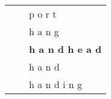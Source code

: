 \documentclass[11pt]{article}
\begin{document}
\begin{spacing}{1}
\begin{table}[!htpb]
\begin{tabular}{p{8cm} l p{5cm}}
                                                                                 &                 & p o r t                                                                                                                                                                                                                                                                                                                                                                                                         \\
                                                                                 &                 & h a n g                                                                                                                                                                                                                                                                                                                                                                                                         \\
                                                                                 &                 & \textbf{h a n d h e a d}                                                                                                                                                                                                                                                                                                                                                                                                 \\
                                                                                 &                 & h a n d                                                                                                                                                                                                                                                                                                                                                                                                         \\
                                                                                 &                 & h a n d i n g                                                                                                                                                                                                                                                                                                                                                                                                   \\

\end{tabular}
\end{table}
\end{spacing}
\end{document}
